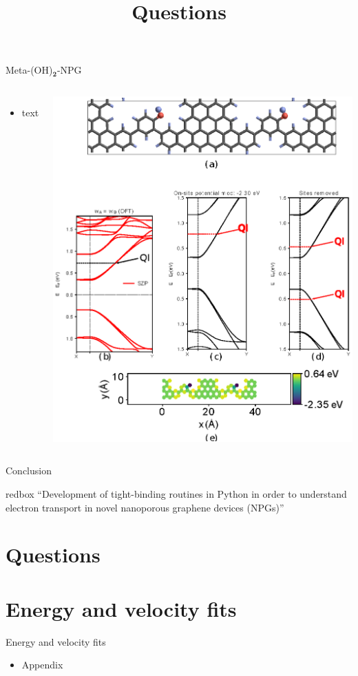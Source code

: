 \documentclass[hyperref={colorlinks=true,urlcolor=blue,linkcolor=.},aspectratio=1610,mathserif]{beamer}
\newcommand*\mathinhead[2]{\texorpdfstring{$\boldsymbol{#1}$}{#2}}
\begin{document}
\begin{frame}{Meta-(OH)\mathinhead{_2}{_2}-NPG}
\centering
\begin{columns}[c]
    \begin{itemize}
        \item text
    \end{itemize}
    \includegraphics[width=\textwidth]{Figures/fig22.eps}
\end{columns}
\end{frame}

\begin{frame}{Conclusion}
	\centering
	\begin{beamercolorbox}[sep=1em,wd=10cm]{redbox}
		``Development of tight-binding routines in Python in order to understand electron transport in novel nanoporous graphene devices (NPGs)''
	\end{beamercolorbox}
\end{frame}

\section*{Questions}
\title{Questions}
\subtitle{}
\begin{frame}
	\titlepage
\end{frame}

\appendix
\section{Energy and velocity fits}
\begin{frame}{Energy and velocity fits}
	\begin{itemize}
		\item Appendix
	\end{itemize}
\end{frame}
\end{document}
